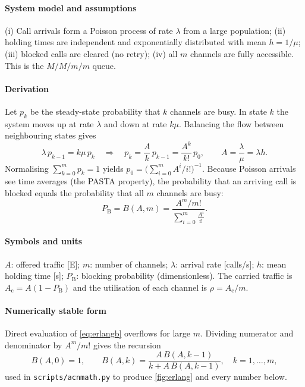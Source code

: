 \documentclass[11pt,a4paper]{article}
\begin{document}
\paragraph{System model and assumptions} (i) Call arrivals form a Poisson process of rate
$\lambda$ from a large population; (ii) holding times are independent and exponentially
distributed with mean $h = 1/\mu$; (iii) blocked calls are cleared (no retry);
(iv) all $m$ channels are fully accessible. This is the $M/M/m/m$ queue.

\paragraph{Derivation} Let $p_k$ be the steady-state probability that $k$ channels are busy.
In state $k$ the system moves up at rate $\lambda$ and down at rate $k\mu$. Balancing the
flow between neighbouring states gives
\begin{equation}\label{eq:balance}
  \lambda\,p_{k-1} = k\mu\,p_k \quad\Longrightarrow\quad
  p_k = \frac{A}{k}\,p_{k-1} = \frac{A^k}{k!}\,p_0, \qquad A = \frac{\lambda}{\mu} = \lambda h .
\end{equation}
Normalising $\sum_{k=0}^{m}p_k = 1$ yields $p_0 = \bigl(\sum_{i=0}^{m}A^i/i!\bigr)^{-1}$.
Because Poisson arrivals see time averages (the PASTA property), the probability that an
arriving call is blocked equals the probability that all $m$ channels are busy:
\begin{equation}\label{eq:erlangb}
  P_{\mathrm{B}} = B(A,m) = \frac{A^m/m!}{\displaystyle\sum_{i=0}^{m}\frac{A^i}{i!}} .
\end{equation}
\paragraph{Symbols and units} $A$: offered traffic [E]; $m$: number of channels; $\lambda$:
arrival rate [calls/s]; $h$: mean holding time [s]; $P_{\mathrm{B}}$: blocking probability
(dimensionless). The carried traffic is $A_{\mathrm{c}} = A(1-P_{\mathrm{B}})$ and the
utilisation of each channel is $\rho = A_{\mathrm{c}}/m$.

\paragraph{Numerically stable form} Direct evaluation of \cref{eq:erlangb} overflows for
large $m$. Dividing numerator and denominator by $A^m/m!$ gives the recursion
\begin{equation}\label{eq:erlangrec}
  B(A,0) = 1, \qquad B(A,k) = \frac{A\,B(A,k-1)}{k + A\,B(A,k-1)}, \quad k = 1,\dots,m,
\end{equation}
used in \texttt{scripts/acnmath.py} to produce \cref{fig:erlang} and every number below.
\end{document}
